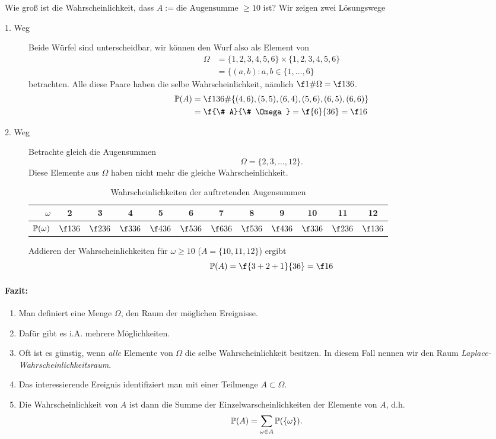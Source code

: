 \begin{ex} \label{0.2.1}
	Wie groß ist die Wahrscheinlichkeit, dass $A := \text{die Augensumme $\ge 10$}$ ist?
	Wir zeigen zwei Lösungswege
	\begin{description}
		\item[1. Weg]
			Beide Würfel sind unterscheidbar, wir können den Wurf also als Element von
			\begin{align*}
				\Omega
				&= \{ 1,2,3,4,5,6 \} \times \{ 1,2,3,4,5,6 \} \\
				&= \{ (a,b): a,b \in \{ 1, \dotsc, 6 \}
			\end{align*}
			betrachten.
			Alle diese Paare haben die selbe Wahrscheinlichkeit, nämlich $\f 1{\# \Omega} = \f 1{36}$.
			\begin{align*}
				\P(A)
				&= \f 1{36} \# \{ (4,6), (5,5), (6,4), (5,6), (6,5), (6,6) \} \\
				&= \f {\# A}{\# \Omega}
				= \f {6}{36}
				= \f 16
			\end{align*}
		\item[2. Weg]
			Betrachte gleich die Augensummen
			\[
				\Omega
				= \{ 2, 3, \dotsc, 12 \}.
			\]
			Diese Elemente aus $\Omega$ haben nicht mehr die gleiche Wahrscheinlichkeit.
			\begin{table}
				\caption{Wahrscheinlichkeiten der auftretenden Augensummen}
				\centering
				\begin{tabular}{r|ccccccccccc}
					$\omega$ & 2 & 3 & 4 & 5 & 6 & 7 & 8 & 9 & 10 & 11 & 12 \\ \hline
					$\P(\omega)$ & $\f 1{36}$ & $\f 2{36}$ & $\f 3{36}$ & $\f 4{36}$ & $\f 5{36}$ &$\f 6{36}$ &$\f 5{36}$ &$\f 4{36}$ &$\f 3{36}$ &$\f 2{36}$ &$\f 1{36}$
				\end{tabular}
			\end{table}
			Addieren der Wahrscheinlichkeiten für $\omega \ge 10$ ($A = \{10,11,12\}$) ergibt
			\[
				\P(A)
				= \f {3+2+1}{36}
				= \f 16
			\]
	\end{description}
\end{ex}

\paragraph{Fazit:}
\begin{enumerate}[1.]
	\item
		Man definiert eine Menge $\Omega$, den Raum der möglichen Ereignisse.
	\item
		Dafür gibt es i.A. mehrere Möglichkeiten.
	\item
		Oft ist es günstig, wenn \emph{alle} Elemente von $\Omega$ die selbe Wahrscheinlichkeit besitzen.
		In diesem Fall nennen wir den Raum \emph{Laplace-Wahrscheinlichkeitsraum}.
	\item
		Das interessierende Ereignis identifiziert man mit einer Teilmenge $A \subset \Omega$.
	\item
		Die Wahrscheinlichkeit von $A$ ist dann die Summe der Einzelwarscheinlichkeiten der Elemente von $A$, d.h.
		\[
			\P(A) = \sum_{\omega \in A} \P(\{\omega\}).
		\]
\end{enumerate}

